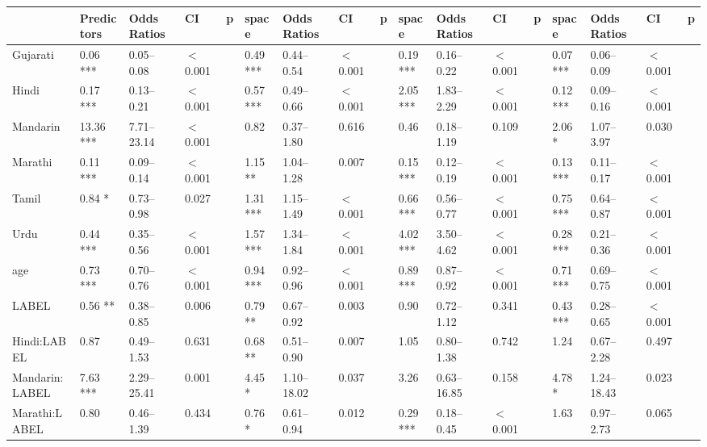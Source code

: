 \begin{table}[ht]
\centering
\begin{tabular}{}
  \hline
 & Predictors & Odds Ratios & CI & p & space & Odds Ratios & CI & p & space & Odds Ratios & CI & p & space & Odds Ratios & CI & p \\ 
  \hline
Gujarati & 0.06 *** & 0.05--0.08 & $<$0.001 &  & 0.49 *** & 0.44--0.54 & $<$0.001 &  & 0.19 *** & 0.16--0.22 & $<$0.001 &  & 0.07 *** & 0.06--0.09 & $<$0.001 \\ 
Hindi & 0.17 *** & 0.13--0.21 & $<$0.001 &  & 0.57 *** & 0.49--0.66 & $<$0.001 &  & 2.05 *** & 1.83--2.29 & $<$0.001 &  & 0.12 *** & 0.09--0.16 & $<$0.001 \\ 
Mandarin & 13.36 *** & 7.71--23.14 & $<$0.001 &  & 0.82 & 0.37--1.80 & 0.616 &  & 0.46 & 0.18--1.19 & 0.109 &  & 2.06 * & 1.07--3.97 & 0.030 \\ 
Marathi & 0.11 *** & 0.09--0.14 & $<$0.001 &  & 1.15 ** & 1.04--1.28 & 0.007 &  & 0.15 *** & 0.12--0.19 & $<$0.001 &  & 0.13 *** & 0.11--0.17 & $<$0.001 \\ 
Tamil & 0.84 * & 0.73--0.98 & 0.027 &  & 1.31 *** & 1.15--1.49 & $<$0.001 &  & 0.66 *** & 0.56--0.77 & $<$0.001 &  & 0.75 *** & 0.64--0.87 & $<$0.001 \\ 
Urdu & 0.44 *** & 0.35--0.56 & $<$0.001 &  & 1.57 *** & 1.34--1.84 & $<$0.001 &  & 4.02 *** & 3.50--4.62 & $<$0.001 &  & 0.28 *** & 0.21--0.36 & $<$0.001 \\ 
age & 0.73 *** & 0.70--0.76 & $<$0.001 &  & 0.94 *** & 0.92--0.96 & $<$0.001 &  & 0.89 *** & 0.87--0.92 & $<$0.001 &  & 0.71 *** & 0.69--0.75 & $<$0.001 \\ 
LABEL & 0.56 ** & 0.38--0.85 & 0.006 &  & 0.79 ** & 0.67--0.92 & 0.003 &  & 0.90 & 0.72--1.12 & 0.341 &  & 0.43 *** & 0.28--0.65 & $<$0.001 \\ 
Hindi:LABEL & 0.87 & 0.49--1.53 & 0.631 &  & 0.68 ** & 0.51--0.90 & 0.007 &  & 1.05 & 0.80--1.38 & 0.742 &  & 1.24 & 0.67--2.28 & 0.497 \\ 

Mandarin:LABEL & 7.63 *** & 2.29--25.41 & 0.001 &  & 4.45 * & 1.10--18.02 & 0.037 &  & 3.26 & 0.63--16.85 & 0.158 &  & 4.78 * & 1.24--18.43 & 0.023 \\ 

Marathi:LABEL & 0.80 & 0.46--1.39 & 0.434 &  & 0.76 * & 0.61--0.94 & 0.012 &  & 0.29 *** & 0.18--0.45 & $<$0.001 &  & 1.63 & 0.97--2.73 & 0.065 \\ 


\end{tabular}
\end{table}
